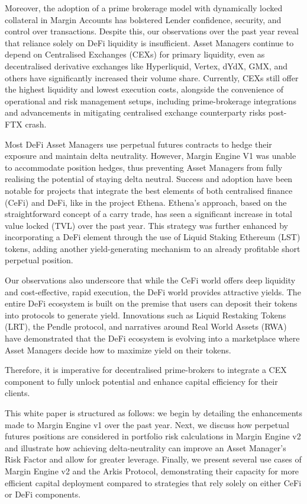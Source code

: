 \documentclass[conference]{IEEEtran}
\begin{document}
Moreover, the adoption of a prime brokerage model with dynamically locked collateral in Margin Accounts has bolstered Lender confidence, security, and control over transactions. Despite this, our observations over the past year reveal that reliance solely on DeFi liquidity is insufficient. Asset Managers continue to depend on Centralised Exchanges (CEXs) for primary liquidity, even as decentralised derivative exchanges like Hyperliquid, Vertex, dYdX, GMX, and others have significantly increased their volume share.\cite{coingecko-volumes} Currently, CEXs still offer the highest liquidity and lowest execution costs, alongside the convenience of operational and risk management setups, including prime-brokerage integrations and advancements in mitigating centralised exchange counterparty risks post-FTX crash.

Most DeFi Asset Managers use perpetual futures contracts to hedge their exposure and maintain delta neutrality. However, Margin Engine V1 was unable to accommodate position hedges, thus preventing Asset Managers from fully realising the potential of staying delta neutral. Success and adoption have been notable for projects that integrate the best elements of both centralised finance (CeFi) and DeFi, like in the project Ethena. Ethena's approach, based on the straightforward concept of a carry trade, has seen a significant increase in total value locked (TVL) over the past year. This strategy was further enhanced by incorporating a DeFi element through the use of Liquid Staking Ethereum (LST) tokens, adding another yield-generating mechanism to an already profitable short perpetual position.\cite{ethena-gitbook}

Our observations also underscore that while the CeFi world offers deep liquidity and cost-effective, rapid execution, the DeFi world provides attractive yields. The entire DeFi ecosystem is built on the premise that users can deposit their tokens into protocols to generate yield. Innovations such as Liquid Restaking Tokens (LRT), the Pendle protocol, and narratives around Real World Assets (RWA) have demonstrated that the DeFi ecosystem is evolving into a marketplace where Asset Managers decide how to maximize yield on their tokens.\cite{eigenlayer-whitepaper}\cite{pendle-whitepaper}

Therefore, it is imperative for decentralised prime-brokers to integrate a CEX component to fully unlock potential and enhance capital efficiency for their clients.

This white paper is structured as follows: we begin by detailing the enhancements made to Margin Engine v1 over the past year. Next, we discuss how perpetual futures positions are considered in portfolio risk calculations in Margin Engine v2 and illustrate how achieving delta-neutrality can improve an Asset Manager’s Risk Factor and allow for greater leverage. Finally, we present several use cases of Margin Engine v2 and the Arkis Protocol, demonstrating their capacity for more efficient capital deployment compared to strategies that rely solely on either CeFi or DeFi components.
 	
\end{document}
